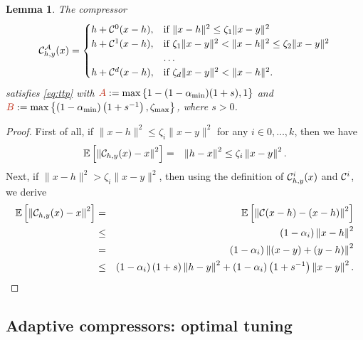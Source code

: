\documentclass[nohyperref]{article}
\theoremstyle{plain}
\newtheorem{lemma}[theorem]{Lemma}
\theoremstyle{definition}
\theoremstyle{remark}
\begin{document}
\begin{lemma}\label{lem:clag}
	The compressor
\begin{eqnarray}\label{eq:ad_compressor2}
\mathcal{C}^{\mathcal{A}}_{h,y}(x) = 
\begin{cases}
h + \mathcal{C}^0(x - h),& \text{if } \|x- h\|^2 \leq \zeta_1 \|x - y\|^2\\
h + \mathcal{C}^1(x - h),& \text{if } \zeta_1 \|x - y\|^2 < \|x- h\|^2 \leq \zeta_2 \|x - y\|^2\\
& \ldots\\
h + \mathcal{C}^d(x - h),& \text{if } \zeta_{d} \|x - y\|^2 < \|x- h\|^2.
\end{cases}
\end{eqnarray} 
	satisfies \eqref{eq:ttp} with $\thetaNEW \eqdef \max\left\{1 - (1-\alpha_{\mathrm{min}})(1+s), 1\right\}$ and $\betaNEW \eqdef \max\left\{(1-\alpha_\mathrm{min})\rb{1+ s^{-1} }, \zeta_\mathrm{max}\right\}$, where $s> 0$.
\end{lemma}
\begin{proof}
	First of all, if $\|x- h\|^2 \leq \zeta_i \|x - y\|^2$ for any $i \in 0, \ldots, k$, then we have
	\begin{eqnarray*}
		{\mathbb E}\left[\left\| \mathcal{C}_{h,y}(x) - x  \right\|^{2}\right] &=& \left\| h-x \right\|^{2} \le \zeta_{i} \left\| x-y \right\|^{2}.
	\end{eqnarray*}
	Next, if $\|x- h\|^2 > \zeta_i \|x - y\|^2$, then using the definition of $\mathcal{C}^i_{h,y}(x)$ and $\mathcal{C}^i$, we derive
	\begin{eqnarray*}
		{\mathbb E}\left[\left\| \mathcal{C}_{h,y}(x) - x  \right\|^{2}\right] &=& {\mathbb E}\left[\left\| \mathcal{C}(x - h) - (x - h)  \right\|^{2}\right]\\
		&\le& (1-\alpha_i) \left\| x-h \right\|^{2}\\
		&=& (1-\alpha_i) \left\| (x - y) + (y - h) \right\|^{2}\\
		&\le& (1-\alpha_i)\left(1+{s}\right)\left\| h - y \right\|^{2} +  (1-\alpha_i)\left(1+s^{-1}\right) \left\| x - y \right\|^{2}.
	\end{eqnarray*}
\end{proof}

\subsection{Adaptive  compressors: optimal tuning}
\end{document}
